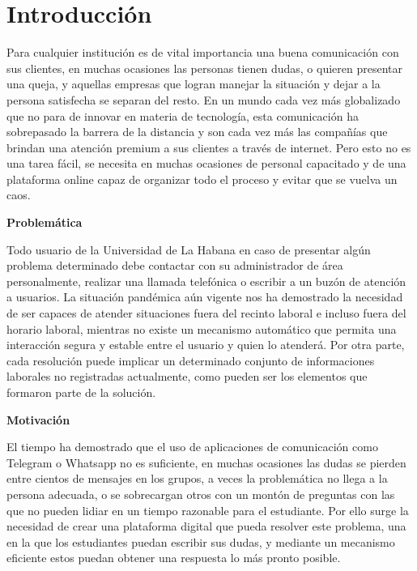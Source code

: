 \chapter*{Introducción}\label{chapter:introduction}

Para cualquier institución es de vital importancia una buena comunicación con sus clientes, en muchas ocasiones las personas tienen dudas, o quieren presentar una queja, y aquellas empresas que logran manejar la situación y dejar a la persona satisfecha se separan del resto. En un mundo cada vez más globalizado que no para de innovar en materia de tecnología, esta comunicación ha sobrepasado la barrera de la distancia y son cada vez más las compañías que brindan una atención premium a sus clientes a través de internet. Pero esto no es una tarea fácil, se necesita en muchas ocasiones de personal capacitado y de una plataforma online capaz de organizar todo el proceso y evitar que se vuelva un caos.
\newline

\textbf{Problemática}
\newline

Todo usuario de la Universidad de La Habana en caso de presentar algún problema determinado debe contactar con su administrador de área personalmente, realizar una llamada telefónica o escribir a un buzón de atención a usuarios. La situación pandémica aún vigente nos ha demostrado la necesidad de ser capaces de atender situaciones fuera del recinto laboral e incluso fuera del horario laboral, mientras no existe un mecanismo automático que permita una interacción segura y estable entre el usuario y quien lo atenderá. Por otra parte, cada resolución puede implicar un determinado conjunto de informaciones laborales no registradas actualmente, como pueden ser los elementos que formaron parte de la solución.\newline

\textbf{Motivación}
\newline

El tiempo ha demostrado que el uso de aplicaciones de comunicación como Telegram o Whatsapp no es suficiente, en muchas ocasiones las dudas se pierden entre cientos de mensajes en los grupos, a veces la problemática no llega a la persona adecuada, o se sobrecargan otros con un montón de preguntas con las que no pueden lidiar en un tiempo razonable para el estudiante. Por ello surge la necesidad de crear una plataforma digital que pueda resolver este problema, una en la que los estudiantes puedan escribir sus dudas, y mediante un mecanismo eficiente estos puedan obtener una respuesta lo más pronto posible.
\newline

